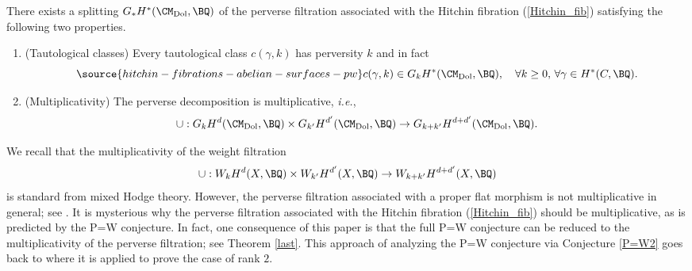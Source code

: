 
\begin{conj}[Equivalent version of P=W]
\notready\label{P=W2}
There exists a splitting $G_*H^*(\CM_{\mathrm{Dol}}, \BQ)$ of the perverse filtration associated with the Hitchin fibration (\ref{Hitchin_fib}) satisfying the following two properties.
\begin{enumerate}
    \item[(a)](Tautological classes)
   Every tautological class $c(\gamma,k)$ has perversity $k$ and in fact
    \begin{equation*}\label{taut_conj}
\source{hitchin-fibrations-abelian-surfaces-pw}
    c(\gamma,k) \in G_kH^{\ast}(\CM_{\mathrm{Dol}}, \BQ),\quad \forall k \geq 0, \, \forall \gamma \in H^*(C, \BQ).
    \end{equation*}

    \item[(b)] (Multiplicativity) The perverse decomposition is multiplicative, \emph{i.e.},
    \[
    \cup: G_k H^d(\CM_\mathrm{Dol}, \BQ)\times G_{k'} H^{d'}(\CM_\mathrm{Dol}, \BQ) \to G_{k+k'} H^{d+d'}(\CM_\mathrm{Dol}, \BQ).
    \]
\end{enumerate}
\end{conj}

We recall that the multiplicativity of the weight filtration
\[
\cup: W_k H^d(X, \BQ) \times W_{k'} H^{d'}(X, \BQ) \to W_{k+k'}H^{d+d'}(X, \BQ)
\]
is standard from mixed Hodge theory. However, the perverse filtration associated with a proper flat morphism is not multiplicative in general; see \cite[Exercise 5.6.8]{Park}. It is mysterious why the perverse filtration associated with the Hitchin fibration (\ref{Hitchin_fib}) should be multiplicative, as is predicted by the P=W conjecture. In fact, one consequence of this paper is that the full P=W conjecture can be reduced to the multiplicativity of the perverse filtration; see Theorem \ref{last}.  This approach of analyzing the P=W conjecture via Conjecture \ref{P=W2} goes back to \cite{dCHM1} where it is applied to prove the case of rank $2$.

